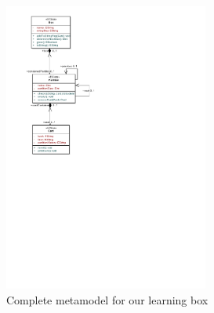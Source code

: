 \begin{stepbystep}
\begin{figure}[htbp]
	\centering
  \includegraphics[width=0.6\textwidth]{../../org.moflon.doc.handbook.02_leitnersLearningBox/2_staticSemantics/4_creatingMethods/cmVisImages/ea_metamodelComplete}
\caption[Complete metamodel for our learning box.]{Complete metamodel for our learning box}
	\label{ea:metamodel_complete}
\end{figure}
\FloatBarrier

\end{stepbystep}

